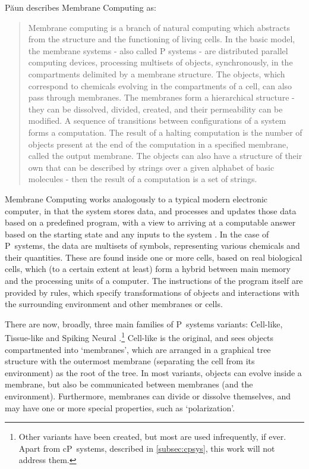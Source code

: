Păun describes Membrane Computing \cite[p.~VII]{Paun2002} as:
\begin{quote}
Membrane computing is a branch of natural computing which abstracts from
the structure and the functioning of living cells. In the basic model, the membrane
systems - also called P systems - are distributed parallel computing
devices, processing multisets of objects, synchronously, in the compartments
delimited by a membrane structure. The objects, which correspond to chemicals
evolving in the compartments of a cell, can also pass through membranes.
The membranes form a hierarchical structure - they can be dissolved, divided,
created, and their permeability can be modified. A sequence of transitions between
configurations of a system forms a computation. The result of a halting
computation is the number of objects present at the end of the computation
in a specified membrane, called the output membrane. The objects can also
have a structure of their own that can be described by strings over a given
alphabet of basic molecules - then the result of a computation is a set of
strings.
\end{quote}

Membrane Computing works analogously to a typical modern electronic computer, in that the system stores data, and processes and updates those data based on a predefined program, with a view to arriving at a computable answer based on the starting state and any inputs to the system \cite{Paun2002,Paun2010b}.  In the case of P~systems, the data are multisets of symbols, representing various chemicals and their quantities.  These are found inside one or more cells, based on real biological cells, which (to a certain extent at least) form a hybrid between main memory and the processing units of a computer.  The instructions of the program itself are provided by rules, which specify transformations of objects and interactions with the surrounding environment and other membranes or cells.

There are now, broadly, three main families of P~systems variants:  Cell-like, Tissue-like \cite{tMaPaPaRo01a,Martin-Vide2003} and Spiking Neural \cite{Ionescu2006}.\footnote{Other variants have been created, but most are used infrequently, if ever.  Apart from cP~systems, described in \autoref{subsec:cpsys}, this work will not address them.}  Cell-like is the original, and sees objects compartmented into `membranes', which are arranged in a graphical tree structure with the outermost membrane (separating the cell from its environment) as the root of the tree.  In most variants, objects can evolve inside a membrane, but also be communicated between membranes (and the environment).  Furthermore, membranes can divide or dissolve themselves, and may have one or more special properties, such as `polarization'.

